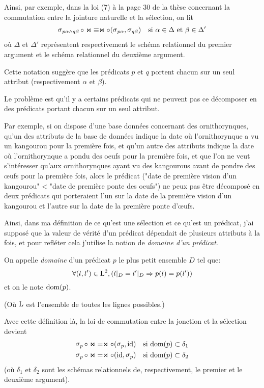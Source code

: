Ainsi, par exemple, dans la loi (7) à la page 30 de la thèse
concernant la commutation entre la jointure naturelle et la
sélection,
on lit
\begin{align*}
\sel_{p\alpha \wedge q\beta} \circ \Join
& \equiv \Join \circ (\sel_{p\alpha}, \sel_{q\beta})
& \text{si $\alpha \in \Delta$ et $\beta \in \Delta'$}
\end{align*}
où $\Delta$ et $\Delta'$ représentent respectivement le schéma relationnel
du premier argument et le schéma relationnel du deuxième argument.

Cette notation suggère que les prédicats $p$ et $q$ portent
chacun sur un seul attribut (respectivement $\alpha$ et $\beta$).

Le problème est qu'il y a certains prédicats qui ne peuvent
pas ce décomposer en des prédicats portant chacun sur un seul attribut.

Par exemple, si on dispose d'une base données concernant
des ornithorynques, qu'un des attributs de la base de données indique
la date où l'ornithorynque a vu un kangourou pour la première fois,
et qu'un autre des attributs indique la date où l'ornithorynque a pondu des oeufs
pour la première fois,
et que l'on ne veut s'intéresser qu'aux ornithorynques ayant vu des kangourous avant
de pondre des œufs pour la première fois, alors le prédicat
("date de première vision d'un kangourou" < "date de première ponte des oeufs")
ne peux pas être décomposé en deux prédicats qui porteraient l'un sur
la date de la première vision d'un kangourou et l'autre sur la date de la
première ponte d'œufs.

Ainsi, dans ma définition de ce qu'est une sélection et ce qu'est un prédicat,
j'ai supposé que la valeur de vérité d'un prédicat dépendait de plusieurs
attributs à la fois, et pour refléter cela j'utilise la notion de
\emph{domaine d'un prédicat}.

\begin{defi*}
On appelle \emph{domaine} d'un prédicat $p$ le plus petit
	ensemble $D$ tel que:
	$$
	\forall (l, l') \in \operatorname{L}^2, (l|_D = l'|_D \Rightarrow  p(l) = p(l'))
	$$
	et on le note $\operatorname{dom}(p)$.

	(Où $\operatorname{L}$ est l'ensemble de toutes les lignes possibles.)
\end{defi*}

Avec cette définition là, la loi de commutation entre la jonction
et la sélection devient
\begin{align*}
\selP \circ \Join
& = \Join \circ (\selP, \id)
& \text{si $\dom(p) \subset \delta_1$}
\label{seljoin1}\\
\selP \circ \Join
& = \Join \circ (\id, \selP)
& \text{si $\dom(p) \subset \delta_2$}
\end{align*}
(où $\delta_1$ et $\delta_2$ sont les schémas relationnels de, respectivement,
le premier et le deuxième argument).


